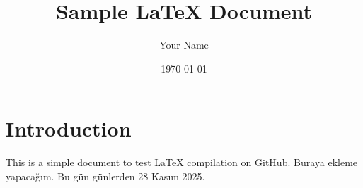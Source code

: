 \documentclass{article}
\begin{document}
\title{Sample LaTeX Document}
\author{Your Name}
\date{\today}
\maketitle

\section{Introduction}
This is a simple document to test LaTeX compilation on GitHub. Buraya ekleme yapacağım. Bu gün günlerden 28 Kasım 2025. 
\end{document}
